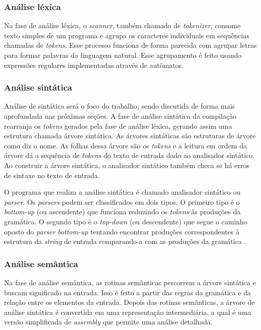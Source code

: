 \subsubsection{Análise léxica}
Na fase de análise léxica, o \textit{scanner}, também chamado de \textit{tokenizer}, consome texto simples de um programa e agrupa os caracteres individuais em sequências chamadas de \textit{tokens}. Esse processo funciona de forma parecida com agrupar letras para formar palavras da linguagem natural. Esse agrupamento é feito usando expressões regulares implementadas através de autômatos.

\subsubsection{Análise sintática}
Análise de sintática será o foco do trabalho, sendo discutida de forma mais aprofundada nas próximas seções. A fase de análise sintática da compilação rearranja os \textit{tokens} gerados pela fase de análise léxica, gerando assim uma estrutura chamada árvore sintática. As árvores sintáticas são estruturas de árvore como diz o nome. As folhas dessa árvore são os \textit{tokens} e a leitura em ordem da árvore dá a sequência de \textit{tokens} do texto de entrada dado ao analisador sintático. Ao construir a árvore sintática, o analisador sintático também checa se há erros de sintaxe no texto de entrada.

O programa que realiza a análise sintática é chamado analisador sintático ou \textit{parser}. Os \textit{parsers} podem ser classificados em dois tipos. O primeiro tipo é o \textit{bottom-up} (ou ascendente) que funciona reduzindo os \textit{tokens} às produções da gramática. O segundo tipo é o \textit{top-down} (ou descendente) que segue o caminho oposto do \textit{parser bottom-up} tentando encontrar produções correspondentes à estrutura da \textit{string} de entrada comparando-a com as produções da gramática \cite{cooper2022engineering}.

\subsubsection{Análise semântica}
Na fase de análise semântica, as rotinas semânticas percorrem a árvore sintática e buscam significado na entrada. Isso é feito a partir das regras da gramática e da relação entre os elementos da entrada. Depois das rotinas semânticas, a árvore de análise sintática é convertida em uma representação intermediária, a qual é uma versão simplificada de \textit{assembly} que permite uma análise detalhada.

